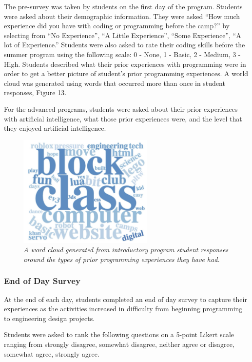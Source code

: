 \documentclass[
]{article}
\begin{document}
The pre-survey was taken by students on the first day of the program.
Students were asked about their demographic information. They were asked
``How much experience did you have with coding or programming before the
camp?'' by selecting from ``No Experience'', ``A Little Experience'',
``Some Experience'', ``A lot of Experience.'' Students were also asked
to rate their coding skills before the summer program using the
following scale: 0 - None, 1 - Basic, 2 - Medium, 3 - High. Students
described what their prior experiences with programming were in order to
get a better picture of student's prior programming experiences. A world
cloud was generated using words that occurred more than once in student
responses, Figure 13.

For the advanced programs, students were asked about their prior
experiences with artificial intelligence, what those prior experiences
were, and the level that they enjoyed artificial intelligence.

\begin{figure}
\centering
\includegraphics[width=0.6\textwidth,height=\textheight]{Graphs/Report/GGEE_23_WordCloud.jpg}
\caption{\emph{A word cloud generated from introductory program student
responses around the types of prior programming experiences they have
had.}}
\end{figure}

\hypertarget{end-of-day-survey}{%
\subsubsection{End of Day Survey}\label{end-of-day-survey}}

At the end of each day, students completed an end of day survey to
capture their experiences as the activities increased in difficulty from
beginning programming to engineering design projects.

Students were asked to rank the following questions on a 5-point Likert
scale ranging from strongly disagree, somewhat disagree, neither agree
or disagree, somewhat agree, strongly agree.
\end{document}
